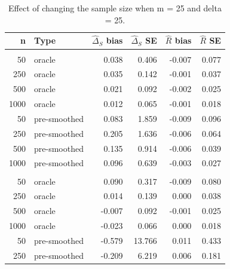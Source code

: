 \documentclass[useAMS,usenatbib,referee]{biom}
\begin{document}
\begin{table}[t]

\caption{\label{tab:large-m-all-nl}Effect of changing the sample size when m = 25 and delta = 25.}
\centering
\begin{tabular}{rlrrrr}
\toprule
n & Type & $\widehat{\Delta}_S$ bias & $\widehat{\Delta}_S$ SE & $\widehat{R}$ bias & $\widehat{R}$ SE\\
\midrule
\addlinespace[0.3em]
\multicolumn{6}{l}{\textbf{GAM}}\\
\hspace{1em}50 & oracle & 0.038 & 0.406 & -0.007 & 0.077\\
\hspace{1em}250 & oracle & 0.035 & 0.142 & -0.001 & 0.037\\
\hspace{1em}500 & oracle & 0.021 & 0.092 & -0.002 & 0.025\\
\hspace{1em}1000 & oracle & 0.012 & 0.065 & -0.001 & 0.018\\
\hspace{1em}50 & pre-smoothed & 0.083 & 1.859 & -0.009 & 0.096\\
\hspace{1em}250 & pre-smoothed & 0.205 & 1.636 & -0.006 & 0.064\\
\hspace{1em}500 & pre-smoothed & 0.135 & 0.914 & -0.006 & 0.039\\
\hspace{1em}1000 & pre-smoothed & 0.096 & 0.639 & -0.003 & 0.027\\
\addlinespace[0.3em]
\multicolumn{6}{l}{\textbf{GAM-unsmoothed}}\\
\hspace{1em}50 & oracle & 0.090 & 0.317 & -0.009 & 0.080\\
\hspace{1em}250 & oracle & 0.014 & 0.139 & 0.000 & 0.038\\
\hspace{1em}500 & oracle & -0.007 & 0.092 & -0.001 & 0.025\\
\hspace{1em}1000 & oracle & -0.023 & 0.066 & 0.000 & 0.018\\
\hspace{1em}50 & pre-smoothed & -0.579 & 13.766 & 0.011 & 0.433\\
\hspace{1em}250 & pre-smoothed & -0.209 & 6.219 & 0.006 & 0.181\\

\end{tabular}
\end{table}
\end{document}
